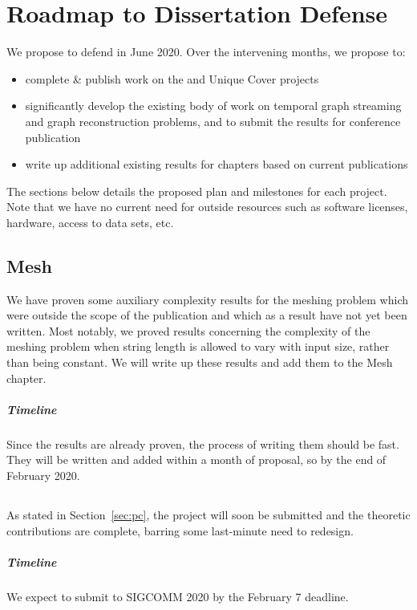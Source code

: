 \chapter{Roadmap to Dissertation Defense}
\label{chap:roadmap}

We propose to defend in June 2020.  Over the intervening months, we propose to:
\begin{itemize}
\item complete \& publish work on the \sysname{} and Unique Cover projects
\item significantly develop the existing body of work on temporal graph streaming and graph reconstruction problems, and to submit the results for conference publication
\item write up additional existing results for chapters based on current publications
\end{itemize}

The sections below details the proposed plan and milestones for each project.  Note that we have no current need for outside resources such as software licenses, hardware, access to data sets, etc.

\section{Mesh}
We have proven some auxiliary complexity results for the meshing problem which were outside the scope of the publication and which as a result have not yet been written.  Most notably, we proved results concerning the complexity of the meshing problem when string length is allowed to vary with input size, rather than being constant.  We will write up these results and add them to the Mesh chapter.

\paragraph*{Timeline}
Since the results are already proven, the process of writing them should be fast.  They will be written and added within a month of proposal, so by the end of February 2020.

\section{\sysname}
As stated in Section~\ref{sec:pc}, the \sysname{} project will soon be submitted and the theoretic contributions are complete, barring some last-minute need to redesign.  

\paragraph*{Timeline}
We expect to submit to SIGCOMM 2020 by the February 7 deadline.

